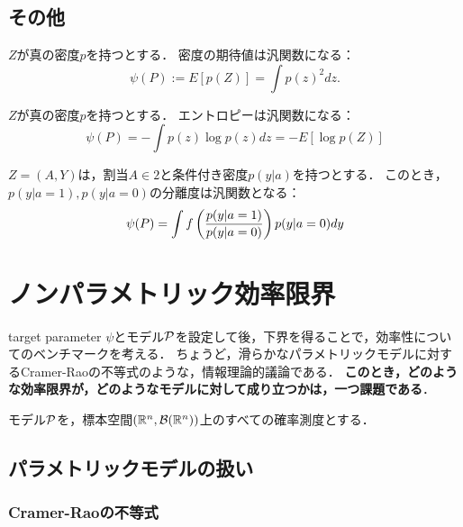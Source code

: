 \documentclass[uplatex,dvipdfmx]{jsreport}
\begin{document}
\subsection{その他}

\begin{example}[密度の期待値]
    $Z$が真の密度$p$を持つとする．
    密度の期待値は汎関数になる：
    \[\psi(P):=E[p(Z)]=\int p(z)^2dz.\]
\end{example}

\begin{example}[エントロピー]
    $Z$が真の密度$p$を持つとする．
    エントロピーは汎関数になる：
    \[\psi(P)=-\int p(z)\log p(z)dz=-E[\log p(Z)]\]
\end{example}

\begin{example}[$f$-分離度]
    $Z=(A,Y)$は，割当$A\in 2$と条件付き密度$p(y|a)$を持つとする．
    このとき，$p(y|a=1),p(y|a=0)$の分離度は汎関数となる：
    \[\psi(P)=\int f\paren{\frac{p(y|a=1)}{p(y|a=0)}}p(y|a=0)dy\]
\end{example}

\section{ノンパラメトリック効率限界}

\begin{tcolorbox}[colframe=ForestGreen, colback=ForestGreen!10!white,breakable,colbacktitle=ForestGreen!40!white,coltitle=black,fonttitle=\bfseries\sffamily,
title=]
    target parameter $\psi$とモデル$\P$を設定して後，下界を得ることで，効率性についてのベンチマークを考える．
    ちょうど，滑らかなパラメトリックモデルに対するCramer-Raoの不等式のような，情報理論的議論である．
    \textbf{このとき，どのような効率限界が，どのようなモデルに対して成り立つかは，一つ課題である}．
\end{tcolorbox}

\begin{notation}
    モデル$\P$を，標本空間$(\R^n,\B(\R^n))$上のすべての確率測度とする．
\end{notation}

\subsection{パラメトリックモデルの扱い}

\subsubsection{Cramer-Raoの不等式}
\end{document}
